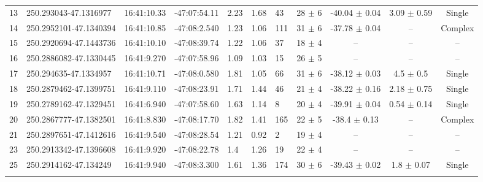 \begin{table}[htbp!]
\begin{tabular}{llllllllccc}
13  &  250.293043-47.1316977  &  16:41:10.33  &  -47:07:54.11  &  2.23  &  1.68  &  43  &  28 $\pm$ 6  &  -40.04 $\pm$ 0.04  &  3.09 $\pm$ 0.59  &  Single \\
14  &  250.2952101-47.1340394  &  16:41:10.85  &  -47:08:2.540  &  1.23  &  1.06  &  111  &  31 $\pm$ 6  &  -37.78 $\pm$ 0.04  &  --  &  Complex \\
15  &  250.2920694-47.1443736  &  16:41:10.10  &  -47:08:39.74  &  1.22  &  1.06  &  37  &  18 $\pm$ 4  &  --  &  --  &  -- \\
16  &  250.2886082-47.1330445  &  16:41:9.270  &  -47:07:58.96  &  1.09  &  1.03  &  15  &  26 $\pm$ 5  &  --  &  --  &  -- \\
17  &  250.294635-47.1334957  &  16:41:10.71  &  -47:08:0.580  &  1.81  &  1.05  &  66  &  31 $\pm$ 6  &  -38.12 $\pm$ 0.03  &  4.5 $\pm$ 0.5  &  Single \\
18  &  250.2879462-47.1399751  &  16:41:9.110  &  -47:08:23.91  &  1.71  &  1.44  &  46  &  21 $\pm$ 4  &  -38.22 $\pm$ 0.16  &  2.18 $\pm$ 0.75  &  Single \\
19  &  250.2789162-47.1329451  &  16:41:6.940  &  -47:07:58.60  &  1.63  &  1.14  &  8  &  20 $\pm$ 4  &  -39.91 $\pm$ 0.04  &  0.54 $\pm$ 0.14  &  Single \\
20  &  250.2867777-47.1382501  &  16:41:8.830  &  -47:08:17.70  &  1.82  &  1.41  &  165  &  22 $\pm$ 5  &  -38.4 $\pm$ 0.13  &  --  &  Complex \\
21  &  250.2897651-47.1412616  &  16:41:9.540  &  -47:08:28.54  &  1.21  &  0.92  &  2  &  19 $\pm$ 4  &  --  &  --  &  -- \\
23  &  250.2913342-47.1396608  &  16:41:9.920  &  -47:08:22.78  &  1.4  &  1.26  &  19  &  22 $\pm$ 4  &  --  &  --  &  -- \\
25  &  250.2914162-47.134249  &  16:41:9.940  &  -47:08:3.300  &  1.61  &  1.36  &  174  &  30 $\pm$ 6  &  -39.43 $\pm$ 0.02  &  1.8 $\pm$ 0.07  &  Single \\
\hline \noalign {\smallskip}
\end{tabular}
\end{table}


